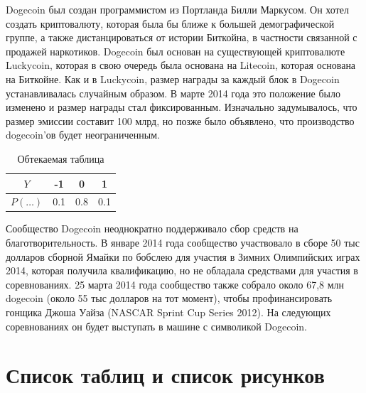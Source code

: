 \documentclass[12pt, a4paper]{article}
\begin{document}
Dogecoin был создан программистом из Портланда Билли Маркусом. Он хотел создать криптовалюту, которая была бы ближе к большей демографической группе, а также дистанцироваться от истории Биткойна, в частности связанной с продажей наркотиков. Dogecoin был основан на существующей криптовалюте Luckycoin, которая в свою очередь была основана на Litecoin, которая основана на Биткойне. Как и в Luckycoin, размер награды за каждый блок в Dogecoin устанавливалась случайным образом. В марте 2014 года это положение было изменено и размер награды стал фиксированным. Изначально задумывалось, что размер эмиссии составит 100 млрд, но позже было объявлено, что производство dogecoin'ов будет неограниченным.

\begin{table}
\begin{center}
\begin{tabular}{|c|c|c|c|}
\hline
$Y$ & -1 & 0 & 1  \\
\hline
$P(\ldots)$ & 0.1 & 0.8 & 0.1 \\
\hline
\end{tabular}
\caption{Обтекаемая таблица}
\end{center}
\end{table}

Сообщество Dogecoin неоднократно поддерживало сбор средств на благотворительность. В январе 2014 года сообщество участвовало в сборе 50 тыс долларов сборной Ямайки по бобслею для участия в Зимних Олимпийских играх 2014, которая получила квалификацию, но не обладала средствами для участия в соревнованиях. 25 марта 2014 года сообщество также собрало около 67,8 млн dogecoin (около 55 тыс долларов на тот момент), чтобы профинансировать гонщика Джоша Уайза (NASCAR Sprint Cup Series 2012). На следующих соревнованиях он будет выступать в машине с символикой Dogecoin.


\section{Список таблиц и список рисунков}

\listoffigures

\listoftables
\end{document}
